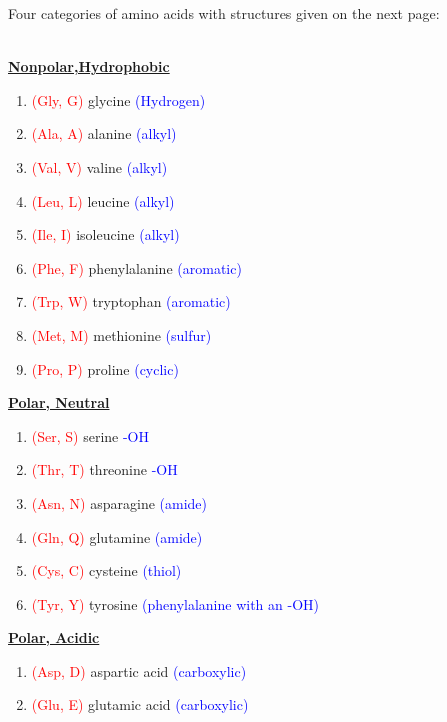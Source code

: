 \documentclass[10pt,a4paper]{report}
\begin{document}
	Four categories of amino acids with structures given on the next page: \\
	\hfill \\
	\noindent\parbox[t]{3in}{\raggedright%
		\textbf{\underline{Nonpolar,Hydrophobic}}
		\begin{enumerate}
			[topsep=2pt,itemsep=-2pt,leftmargin=13pt]
			\item \textcolor{red}{(Gly, G)} glycine \textcolor{blue}{(Hydrogen)}
			\item \textcolor{red}{(Ala, A)} alanine \textcolor{blue}{(alkyl)}
			\item \textcolor{red}{(Val, V)} valine \textcolor{blue}{(alkyl)}
			\item \textcolor{red}{(Leu, L)} leucine \textcolor{blue}{(alkyl)}
			\item \textcolor{red}{(Ile, I)} isoleucine \textcolor{blue}{(alkyl)}
			\item \textcolor{red}{(Phe, F)} phenylalanine \textcolor{blue}{(aromatic)}
			\item \textcolor{red}{(Trp, W)} tryptophan \textcolor{blue}{(aromatic)}
			\item \textcolor{red}{(Met, M)} methionine \textcolor{blue}{(sulfur)}
			\item \textcolor{red}{(Pro, P)} proline \textcolor{blue}{(cyclic)}
		\end{enumerate}
	}
	\hspace{5em}
	\noindent\parbox[t]{3in}{\raggedright%
		\textbf{\underline{Polar, Neutral}}
		\begin{enumerate}
			[topsep=2pt,itemsep=-2pt,leftmargin=13pt]
			\item \textcolor{red}{(Ser, S)} serine \textcolor{blue}{-OH}
			\item \textcolor{red}{(Thr, T)} threonine \textcolor{blue}{-OH}
			\item \textcolor{red}{(Asn, N)} asparagine \textcolor{blue}{(amide)}
			\item \textcolor{red}{(Gln, Q)} glutamine \textcolor{blue}{(amide)}
			\item \textcolor{red}{(Cys, C)} cysteine \textcolor{blue}{(thiol)}
			\item \textcolor{red}{(Tyr, Y)} tyrosine \textcolor{blue}{(phenylalanine with an -OH)}
		\end{enumerate}
	}
	\vspace{10pt}
	\newline
	\noindent\parbox[t]{3in}{\raggedright%
		\textbf{\underline{Polar, Acidic}}
		\begin{enumerate}
			[topsep=2pt,itemsep=-2pt,leftmargin=13pt]
			\item \textcolor{red}{(Asp, D)} aspartic acid \textcolor{blue}{(carboxylic)}
			\item \textcolor{red}{(Glu, E)} glutamic acid \textcolor{blue}{(carboxylic)}
		\end{enumerate}
	}
\end{document}
